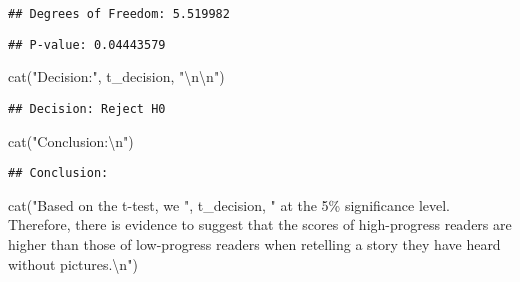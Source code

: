 \documentclass[
]{article}
\newenvironment{Shaded}{\begin{snugshade}}{\end{snugshade}}
\newcommand{\FunctionTok}[1]{\textcolor[rgb]{0.00,0.00,0.00}{#1}}
\newcommand{\NormalTok}[1]{#1}
\newcommand{\SpecialCharTok}[1]{\textcolor[rgb]{0.00,0.00,0.00}{#1}}
\newcommand{\StringTok}[1]{\textcolor[rgb]{0.31,0.60,0.02}{#1}}
\begin{document}
\begin{verbatim}
## Degrees of Freedom: 5.519982
\end{verbatim}

\begin{Shaded}
\end{Shaded}

\begin{verbatim}
## P-value: 0.04443579
\end{verbatim}

\begin{Shaded}
\begin{Highlighting}[]
\FunctionTok{cat}\NormalTok{(}\StringTok{"Decision:"}\NormalTok{, t\_decision, }\StringTok{"}\SpecialCharTok{\textbackslash{}n\textbackslash{}n}\StringTok{"}\NormalTok{)}
\end{Highlighting}
\end{Shaded}

\begin{verbatim}
## Decision: Reject H0
\end{verbatim}

\begin{Shaded}
\begin{Highlighting}[]
\FunctionTok{cat}\NormalTok{(}\StringTok{"Conclusion:}\SpecialCharTok{\textbackslash{}n}\StringTok{"}\NormalTok{)}
\end{Highlighting}
\end{Shaded}

\begin{verbatim}
## Conclusion:
\end{verbatim}

\begin{Shaded}
\begin{Highlighting}[]
\FunctionTok{cat}\NormalTok{(}\StringTok{"Based on the t{-}test, we "}\NormalTok{, t\_decision, }\StringTok{" at the 5\% significance level. Therefore, there is evidence to suggest that the scores of high{-}progress readers are higher than those of low{-}progress readers when retelling a story they have heard without pictures.}\SpecialCharTok{\textbackslash{}n}\StringTok{"}\NormalTok{)}
\end{Highlighting}
\end{Shaded}
\end{document}
